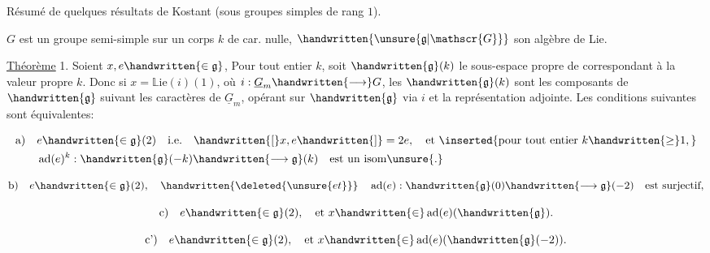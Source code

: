 Résumé de quelques résultats de Kostant (sous groupes simples de rang $1$).

$G$ est un groupe semi-simple sur un corps $k$ de car. nulle, $\handwritten{\unsure{\mathfrak{g}|\mathscr{G}}}$ son algèbre de Lie.

\uline{Théorème} 1.  Soient $x,e\handwritten{\in\mathfrak{g}}$, Pour tout entier $k$, soit $\handwritten{\mathfrak{g}}(k)$ le sous-espace propre de\hspace{1.5em} correspondant à la valeur propre $k$. Donc si $x=\mathbb{L}\mathrm{ie}(i)(1)$, où $i:\underline{G}_m\handwritten{\longrightarrow}G$, les $\handwritten{\mathfrak{g}}(k)$ sont les  composants de $\handwritten{\mathfrak{g}}$ suivant les caractères de $\underline{G}_m$, opérant sur $\handwritten{\mathfrak{g}}$ via $i$ et la représentation adjointe. Les conditions suivantes sont équivalentes:

\[
\begin{aligned}
\text{a)}\quad &e\handwritten{\in\mathfrak{g}}(2)\quad\text{i.e.}\quad \handwritten{[}x,e\handwritten{]}=2e,\quad\text{et }\inserted{\text{pour tout entier }k\handwritten{\geq}1,}\\
&\operatorname{ad}(e)^k:\handwritten{\mathfrak{g}}(-k)\handwritten{\longrightarrow\mathfrak{g}}(k)\quad\text{est un isom}\unsure{.}
\end{aligned}
\]

\[
\text{b)}\quad e\handwritten{\in\mathfrak{g}}(2),\quad\handwritten{\deleted{\unsure{et}}}\quad \operatorname{ad}(e):\handwritten{\mathfrak{g}}(0)\handwritten{\longrightarrow\mathfrak{g}}(-2)\quad\text{est surjectif},
\]


\[
\text{c)}\quad e\handwritten{\in\mathfrak{g}}(2),\quad\text{et }x\handwritten{\in}\operatorname{ad}(e)(\handwritten{\mathfrak{g}}).
\]

\[
\text{c')}\quad e\handwritten{\in\mathfrak{g}}(2),\quad\text{et }x\handwritten{\in}\operatorname{ad}(e)(\handwritten{\mathfrak{g}}(-2)).
\]

